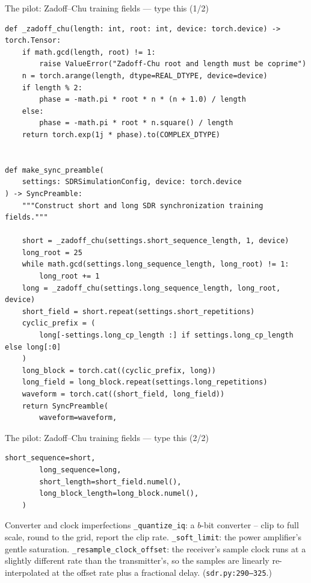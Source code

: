 \documentclass[10pt]{beamer}
\begin{document}
\begin{frame}[fragile]{The pilot: Zadoff--Chu training fields --- type this (1/2)}
\begin{lstlisting}[basicstyle=\ttfamily\tiny]
def _zadoff_chu(length: int, root: int, device: torch.device) -> torch.Tensor:
    if math.gcd(length, root) != 1:
        raise ValueError("Zadoff-Chu root and length must be coprime")
    n = torch.arange(length, dtype=REAL_DTYPE, device=device)
    if length % 2:
        phase = -math.pi * root * n * (n + 1.0) / length
    else:
        phase = -math.pi * root * n.square() / length
    return torch.exp(1j * phase).to(COMPLEX_DTYPE)


def make_sync_preamble(
    settings: SDRSimulationConfig, device: torch.device
) -> SyncPreamble:
    """Construct short and long SDR synchronization training fields."""

    short = _zadoff_chu(settings.short_sequence_length, 1, device)
    long_root = 25
    while math.gcd(settings.long_sequence_length, long_root) != 1:
        long_root += 1
    long = _zadoff_chu(settings.long_sequence_length, long_root, device)
    short_field = short.repeat(settings.short_repetitions)
    cyclic_prefix = (
        long[-settings.long_cp_length :] if settings.long_cp_length else long[:0]
    )
    long_block = torch.cat((cyclic_prefix, long))
    long_field = long_block.repeat(settings.long_repetitions)
    waveform = torch.cat((short_field, long_field))
    return SyncPreamble(
        waveform=waveform,
\end{lstlisting}
\end{frame}

\begin{frame}[fragile]{The pilot: Zadoff--Chu training fields --- type this (2/2)}
\begin{lstlisting}[basicstyle=\ttfamily\scriptsize]
        short_sequence=short,
        long_sequence=long,
        short_length=short_field.numel(),
        long_block_length=long_block.numel(),
    )
\end{lstlisting}
\end{frame}

\begin{frame}{Converter and clock imperfections}
  \texttt{\_quantize\_iq}: a $b$-bit converter -- clip to full
  scale, round to the grid, report the clip rate.
  \texttt{\_soft\_limit}: the power amplifier's gentle
  saturation. \texttt{\_resample\_clock\_offset}: the receiver's
  sample clock runs at a slightly different rate than the
  transmitter's, so the samples are linearly re-interpolated at
  the offset rate plus a fractional delay.
  (\texttt{sdr.py:290--325}.)
\end{frame}
\end{document}
